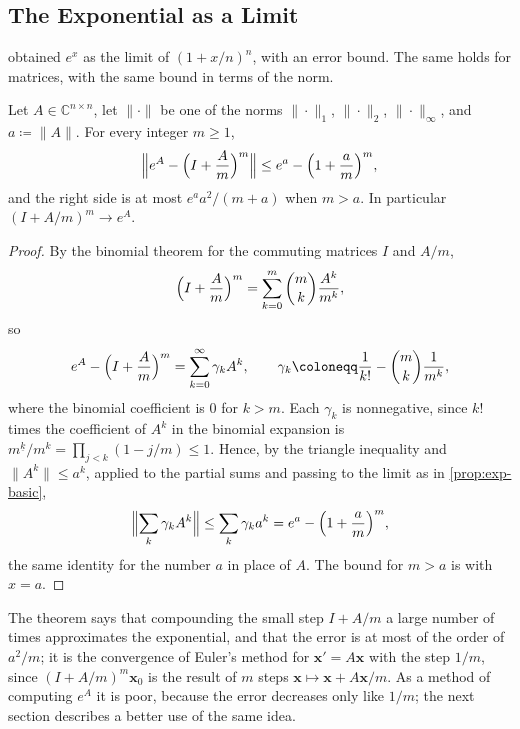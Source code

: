 \subsection{The Exponential as a Limit}

 obtained $e^x$ as the limit of $(1+x/n)^n$, with an error bound. The same holds for matrices, with the same bound in terms of the norm.

\begin{theorem}
\label{thm:exp-limit-matrix}
Let $A\in\mathbb C^{n\times n}$, let $\|\cdot\|$ be one of the norms $\|\cdot\|_1$, $\|\cdot\|_2$, $\|\cdot\|_\infty$, and $a\coloneqq\|A\|$. For every integer $m\ge1$,
\[
\Bigl\|e^A-\Bigl(I+\frac Am\Bigr)^m\Bigr\|\le e^a-\Bigl(1+\frac am\Bigr)^m ,
\]
and the right side is at most $e^aa^2/(m+a)$ when $m>a$. In particular $(I+A/m)^m\to e^A$.
\end{theorem}

\begin{proof}
By the binomial theorem for the commuting matrices $I$ and $A/m$,
\[
\Bigl(I+\frac Am\Bigr)^m=\sum_{k=0}^m\binom mk\frac{A^k}{m^k},
\]
so
\[
e^A-\Bigl(I+\frac Am\Bigr)^m=\sum_{k=0}^\infty\gamma_kA^k,\qquad\gamma_k\coloneqq\frac1{k!}-\binom mk\frac1{m^k},
\]
where the binomial coefficient is $0$ for $k>m$. Each $\gamma_k$ is nonnegative, since $k!$ times the coefficient of $A^k$ in the binomial expansion is $m^{\underline k}/m^k=\prod_{j<k}(1-j/m)\le1$. Hence, by the triangle inequality and $\|A^k\|\le a^k$, applied to the partial sums and passing to the limit as in \cref{prop:exp-basic},
\[
\Bigl\|\sum_k\gamma_kA^k\Bigr\|\le\sum_k\gamma_ka^k=e^a-\Bigl(1+\frac am\Bigr)^m ,
\]
the same identity for the number $a$ in place of $A$. The bound for $m>a$ is  with $x=a$.
\end{proof}

The theorem says that compounding the small step $I+A/m$ a large number of times approximates the exponential, and that the error is at most of the order of $a^2/m$; it is the convergence of Euler's method for $\mathbf x'=A\mathbf x$ with the step $1/m$, since $(I+A/m)^m\mathbf x_0$ is the result of $m$ steps $\mathbf x\mapsto\mathbf x+A\mathbf x/m$. As a method of computing $e^A$ it is poor, because the error decreases only like $1/m$; the next section describes a better use of the same idea.


